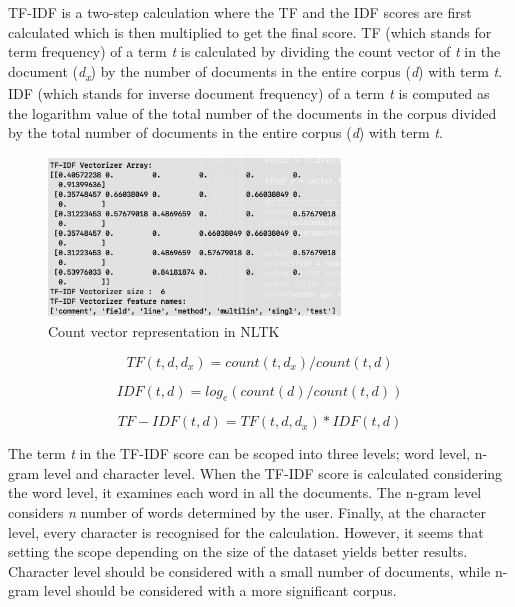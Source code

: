 \documentclass[conference]{IEEEtran}
\begin{document}
TF-IDF is a two-step calculation where the TF and the IDF scores are first calculated which is then multiplied to get the final score. TF (which stands for term frequency) of a term \textit{t} is calculated by dividing the count vector of \textit{t} in the document (\textit{d\textsubscript{x}}) by the number of documents in the entire corpus (\textit{d}) with term \textit{t}. IDF (which stands for inverse document frequency) of a term \textit{t} is computed as the logarithm value of the total number of the documents in the corpus divided by the total number of documents in the entire corpus (\textit{d}) with term \textit{t}. \cite{scikit-learn}

\begin{figure}[!h]
\centerline{\includegraphics[width=7.75cm, height=4.25cm]{graphics/tfidf-vec.png}}
\caption{Count vector representation in NLTK}
\label{fig}
\end{figure}

\begin{equation}
\label{tf-calculation}
TF(t,d,d_x) = count(t,d_x) / count(t,d)
\end{equation}

\begin{equation}
\label{tf-calculation}
IDF(t,d) = log_e (count(d) / count(t,d))
\end{equation}

\begin{equation}
\label{tf-calculation}
TF-IDF(t,d) = TF(t,d,d_x) * IDF(t,d)
\end{equation}

The term \textit{t} in the TF-IDF score can be scoped into three levels; word level, n-gram level and character level. When the TF-IDF score is calculated considering the word level, it examines each word in all the documents. The n-gram level considers \textit{n} number of words determined by the user. Finally, at the character level, every character is recognised for the calculation. However, it seems that setting the scope depending on the size of the dataset yields better results. Character level should be considered with a small number of documents, while n-gram level should be considered with a more significant corpus. 
\end{document}
